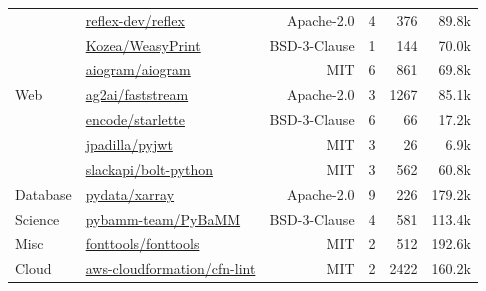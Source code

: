 \begin{table}[htbp]
{\begin{tabular}{llrrrr}
\midrule
\multirow{7}{*}{Web} & \href{https://github.com/reflex-dev/reflex}{reflex-dev/reflex} & Apache-2.0 & 4 & 376 & 89.8k \\
& \href{https://github.com/Kozea/WeasyPrint}{Kozea/WeasyPrint} & BSD-3-Clause & 1 & 144 & 70.0k \\
& \href{https://github.com/aiogram/aiogram}{aiogram/aiogram} & MIT & 6 & 861 & 69.8k \\
& \href{https://github.com/ag2ai/faststream}{ag2ai/faststream} & Apache-2.0 & 3 & 1267 & 85.1k \\
& \href{https://github.com/encode/starlette}{encode/starlette} & BSD-3-Clause & 6 & 66 & 17.2k \\
& \href{https://github.com/jpadilla/pyjwt}{jpadilla/pyjwt} & MIT & 3 & 26 & 6.9k \\
& \href{https://github.com/slackapi/bolt-python}{slackapi/bolt-python} & MIT & 3 & 562 & 60.8k \\
\midrule
\multirow{1}{*}{Database} & \href{https://github.com/pydata/xarray}{pydata/xarray} & Apache-2.0 & 9 & 226 & 179.2k \\
\midrule
\multirow{1}{*}{Science} & \href{https://github.com/pybamm-team/PyBaMM}{pybamm-team/PyBaMM} & BSD-3-Clause & 4 & 581 & 113.4k \\
\midrule
\multirow{1}{*}{Misc} & \href{https://github.com/fonttools/fonttools}{fonttools/fonttools} & MIT & 2 & 512 & 192.6k \\
\midrule
\multirow{1}{*}{Cloud} & \href{https://github.com/aws-cloudformation/cfn-lint}{aws-cloudformation/cfn-lint} & MIT & 2 & 2422 & 160.2k \\
\bottomrule
\end{tabular}
}
\end{table}

